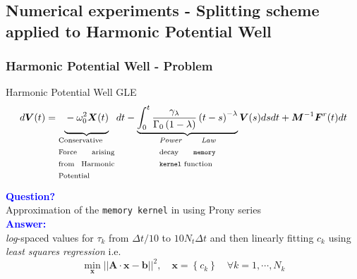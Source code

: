 \documentclass[a4paper,10pt]{beamer}
\newcommand{\BS}[1]{\boldsymbol{#1}}
\newcommand{\rb}[1]{\left( #1 \right)}
\newcommand{\norm}[1]{\left| \left| #1 \right| \right|}
\begin{document}
	\begin{frame}
		\subsection{Numerical experiments - Splitting scheme applied to Harmonic Potential Well}
		\frametitle{Harmonic Potential Well - Problem}
		\begin{block}{Harmonic Potential Well GLE}
			\footnotesize
			\begin{align}
				d\BS{V}(t) = \underbrace{\vphantom{\int_{0}^{t} \frac{\gamma_{\lambda}}{\Gamma_{0} \rb{1-\lambda}}\rb{t-s}^{-\lambda} \BS{V}(s) ds dt} -\omega^{2}_{0} \BS{X}(t)}_{\text{\begin{minipage}{0.165\linewidth}
						Conservative Force arising from Harmonic Potential
						\end{minipage}}}dt - \underbrace{\int_{0}^{t} \frac{\gamma_{\lambda}}{\Gamma_{0} \rb{1-\lambda}}\rb{t-s}^{-\lambda}}_{\text{\begin{minipage}{0.165\linewidth}
						\textit{Power Law} decay \texttt{memory kernel} function
						\end{minipage}}} \BS{V}(s) ds dt + \BS{M}^{-1} \BS{F}^{r}(t) dt
						\label{eq:HarmonicGLE}
			\end{align}
		\end{block}
		\textcolor{blue}{\textbf{Question?}} \\ Approximation of the \texttt{memory kernel} in  using Prony series \\
		\textcolor{blue}{\textbf{Answer:}} \\
		\textit{log}-spaced values for $\tau_{k}$ from $\Delta t/10$ to $10N_{t}\Delta t$ and then linearly fitting $c_{k}$ using \textit{least squares regression} i.e. $$\min_{\BS{x}} \norm{\BS{A}\cdot \BS{x}-\BS{b}}^{2}, \quad \BS{x} = \left\{ c_{k} \right\} \quad \forall
		 k=1, \cdots, N_{k}$$
	\end{frame}
\end{document}
